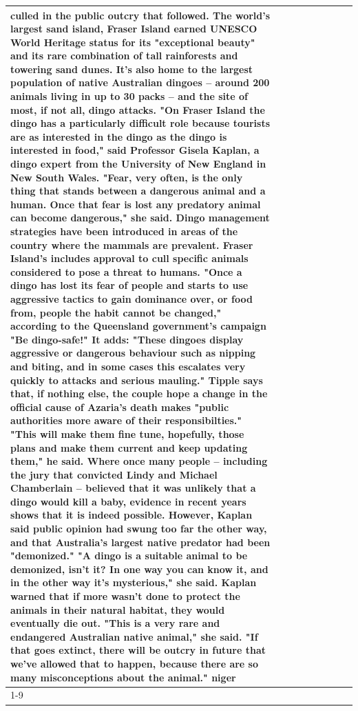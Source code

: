 \begin{table}[H]
\begin{tabular}{lllrlllll}
culled in the public outcry that followed. The world's largest sand island, Fraser Island earned UNESCO World Heritage status for its "exceptional beauty" and its rare combination of tall rainforests and towering sand dunes. It's also home to the largest population of native Australian dingoes -- around 200 animals living in up to 30 packs -- and the site of most, if not all, dingo attacks. "On Fraser Island the dingo has a particularly difficult role because tourists are as interested in the dingo as the dingo is interested in food," said Professor Gisela Kaplan, a dingo expert from the University of New England in New South Wales. "Fear, very often, is the only thing that stands between a dangerous animal and a human. Once that fear is lost any predatory animal can become dangerous," she said. Dingo management strategies have been introduced in areas of the country where the mammals are prevalent. Fraser Island's includes approval to cull specific animals considered to pose a threat to humans. "Once a dingo has lost its fear of people and starts to use aggressive tactics to gain dominance over, or food from, people the habit cannot be changed," according to the Queensland government's campaign "Be dingo-safe!" It adds: "These dingoes display aggressive or dangerous behaviour such as nipping and biting, and in some cases this escalates very quickly to attacks and serious mauling." Tipple says that, if nothing else, the couple hope a change in the official cause of Azaria's death makes "public authorities more aware of their responsibilties." "This will make them fine tune, hopefully, those plans and make them current and keep updating them," he said. Where once many people -- including the jury that convicted Lindy and Michael Chamberlain -- believed that it was unlikely that a dingo would kill a baby, evidence in recent years shows that it is indeed possible. However, Kaplan said public opinion had swung too far the other way, and that Australia's largest native predator had been "demonized." "A dingo is a suitable animal to be demonized, isn't it? In one way you can know it, and in the other way it's mysterious," she said. Kaplan warned that if more wasn't done to protect the animals in their natural habitat, they would eventually die out. "This is a very rare and endangered Australian native animal," she said. "If that goes extinct, there will be outcry in future that we've allowed that to happen, because there are so many misconceptions about the animal." niger \\
\cline{1-9}

\end{tabular}
\end{table}
